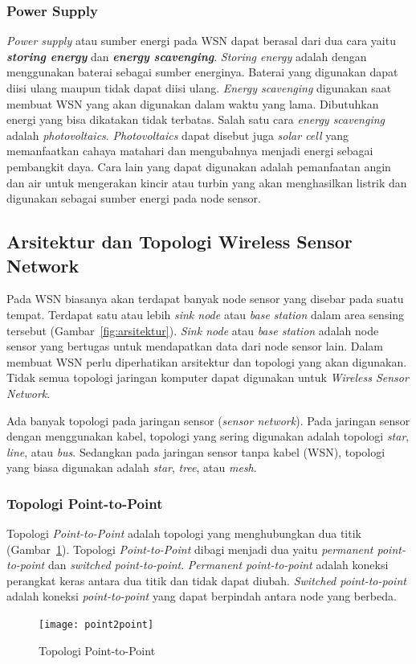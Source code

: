 \subsubsection{Power Supply}
\textit{Power supply} atau sumber energi pada WSN dapat berasal dari dua cara yaitu \textbf{\textit{storing energy}} dan \textbf{\textit{energy scavenging}}. \textit{Storing energy} adalah dengan menggunakan baterai sebagai sumber energinya. Baterai yang digunakan dapat diisi ulang maupun tidak dapat diisi ulang. \textit{Energy scavenging} digunakan saat membuat WSN yang akan digunakan dalam waktu yang lama. Dibutuhkan energi yang bisa dikatakan tidak terbatas. Salah satu cara \textit{energy scavenging} adalah \textit{photovoltaics}. \textit{Photovoltaics} dapat disebut juga \textit{solar cell} yang memanfaatkan cahaya matahari dan mengubahnya menjadi energi sebagai pembangkit daya. Cara lain yang dapat digunakan adalah pemanfaatan angin dan air untuk mengerakan kincir atau turbin yang akan menghasilkan listrik dan digunakan sebagai sumber energi pada node sensor.

\subsection{Arsitektur dan Topologi Wireless Sensor Network}
Pada WSN biasanya akan terdapat banyak node sensor yang disebar pada suatu tempat. Terdapat satu atau lebih \textit{sink node} atau \textit{base station} dalam area sensing tersebut (Gambar~\ref{fig:arsitektur}). \textit{Sink node} atau \textit{base station} adalah node sensor yang bertugas untuk mendapatkan data dari node sensor lain. Dalam membuat WSN perlu diperhatikan arsitektur dan topologi yang akan digunakan. Tidak semua topologi jaringan komputer dapat digunakan untuk \textit{Wireless Sensor Network}. 

Ada banyak topologi pada jaringan sensor (\textit{sensor network}). Pada jaringan sensor dengan menggunakan kabel, topologi yang sering digunakan adalah topologi \textit{star}, \textit{line}, atau \textit{bus}. Sedangkan pada jaringan sensor tanpa kabel (WSN), topologi yang biasa digunakan adalah \textit{star}, \textit{tree}, atau \textit{mesh}. 

\subsubsection{Topologi Point-to-Point}
Topologi \textit{Point-to-Point} adalah topologi yang menghubungkan dua titik (Gambar~\ref{fig:point2point}). Topologi \textit{Point-to-Point} dibagi menjadi dua yaitu \textit{permanent point-to-point} dan \textit{switched point-to-point}. \textit{Permanent point-to-point} adalah koneksi perangkat keras antara dua titik dan tidak dapat diubah. \textit{Switched point-to-point} adalah koneksi \textit{point-to-point} yang dapat berpindah antara node yang berbeda. 
\begin{figure} [H]
	\centering  
	\texttt{[image: point2point]}  
	\caption[Topologi Point-to-Point]{Topologi Point-to-Point} 
	\label{fig:point2point} 
\end{figure} 

